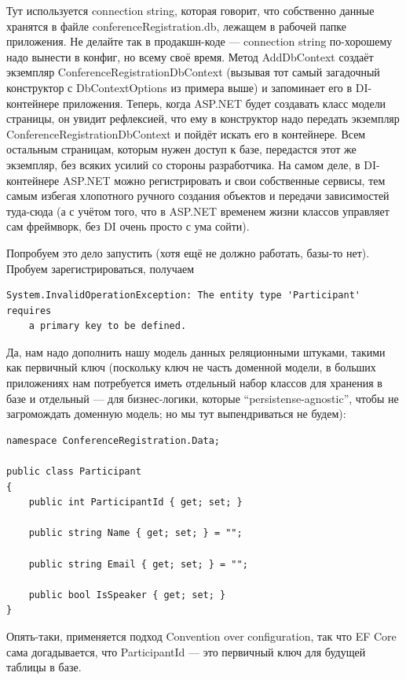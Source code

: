 \documentclass{../../text-style}
\begin{document}
Тут используется connection string, которая говорит, что собственно данные хранятся в файле conferenceRegistration.db, лежащем в рабочей папке приложения. Не делайте так в продакшн-коде --- connection string по-хорошему надо вынести в конфиг, но всему своё время. Метод AddDbContext создаёт экземпляр ConferenceRegistrationDbContext (вызывая тот самый загадочный конструктор с DbContextOptions из примера выше) и запоминает его в DI-контейнере приложения. Теперь, когда ASP.NET будет создавать класс модели страницы, он увидит рефлексией, что ему в конструктор надо передать экземпляр ConferenceRegistrationDbContext и пойдёт искать его в контейнере. Всем остальным страницам, которым нужен доступ к базе, передастся этот же экземпляр, без всяких усилий со стороны разработчика. На самом деле, в DI-контейнере ASP.NET можно регистрировать и свои собственные сервисы, тем самым избегая хлопотного ручного создания объектов и передачи зависимостей туда-сюда (а с учётом того, что в ASP.NET временем жизни классов управляет сам фреймворк, без DI очень просто с ума сойти).

Попробуем это дело запустить (хотя ещё не должно работать, базы-то нет). Пробуем зарегистрироваться, получаем 

\begin{verbatim}
System.InvalidOperationException: The entity type 'Participant' requires 
    a primary key to be defined.
\end{verbatim}

Да, нам надо дополнить нашу модель данных реляционными штуками, такими как первичный ключ (поскольку ключ не часть доменной модели, в больших приложениях нам потребуется иметь отдельный набор классов для хранения в базе и отдельный --- для бизнес-логики, которые \enquote{persistense-agnostic}, чтобы не загромождать доменную модель; но мы тут выпендриваться не будем):

\begin{verbatim}
namespace ConferenceRegistration.Data;

public class Participant
{
    public int ParticipantId { get; set; }

    public string Name { get; set; } = "";

    public string Email { get; set; } = "";

    public bool IsSpeaker { get; set; }
}
\end{verbatim}

Опять-таки, применяется подход Convention over configuration, так что EF Core сама догадывается, что ParticipantId --- это первичный ключ для будущей таблицы в базе.
\end{document}
